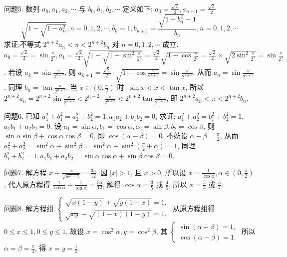 问题5. 数列 $a_0, a_1, a_2, \cdots$ 与 $b_0, b_1, b_2, \cdots$ 定义如下: $a_0=\frac{\sqrt{2}}{2}, a_{n+1}=\frac{\sqrt{2}}{2}$
$$
\sqrt{1-\sqrt{1-a_n^2}}, n=0,1,2, \cdots, b_0=1, b_{n+1}=\frac{\sqrt{1+b_n^2}-1}{b_n}, n=0,1,2, \cdots
$$
求证:不等式 $2^{n+2} a_n<\pi<2^{n+2} b_n$ 对 $n=0,1,2, \cdots$ 成立.
$a_0=\frac{\sqrt{2}}{2}=\sin \frac{\pi}{2^2}, a_1=\frac{\sqrt{2}}{2} \sqrt{1-\sqrt{1-\sin ^2 \frac{\pi}{2^2}}}=\frac{\sqrt{2}}{2} \sqrt{1-\cos \frac{\pi}{2^2}}=\frac{\sqrt{2}}{2} \times \sqrt{2 \sin ^2 \frac{\pi}{2^3}}=\sin \frac{\pi}{2^3}$. 若设 $a_k=\sin \frac{\pi}{2^{k+2}}$, 则 $a_{k+1}=\frac{\sqrt{2}}{2} \cdot \sqrt{1-\cos \frac{\pi}{2^{k+2}}}=\sin \frac{\pi}{2^{k+3}}$, 从而 $a_n=\sin \frac{\pi}{2^{n+2}}$. 同理 $b_n=\tan \frac{\pi}{2^{n+2}}$. 当 $x \in\left(0, \frac{\pi}{2}\right)$ 时, $\sin x<x<\tan x$, 所以 $2^{n+2} a_n=2^{n+2} \sin \frac{\pi}{2^{n+2}}<2^{n+2} \cdot \frac{\pi}{2^{n+2}}<2^{n+2} \tan \frac{\pi}{2^{n+2}}$, 即 $2^{n+2} a_n<\pi<2^{n+2} b_n$.



问题6. 已知 $a_1^2+b_1^2=a_2^2+b_2^2=1, a_1 a_2+b_1 b_2=0$, 求证: $a_1^2+a_2^2=b_1^2+b_2^2=1$, $a_1 b_1+a_2 b_2=0$.
设 $a_1=\sin \alpha, b_1=\cos \alpha, a_2=\sin \beta, b_2=\cos \beta$, 则 $\sin \alpha \sin \beta+ \cos \alpha \cos \beta=0$, 即 $\cos (\alpha-\beta)=0$. 不妨设 $\alpha-\beta=\frac{\pi}{2}$, 从而 $a_1^2+a_2^2=\sin ^2 \alpha+ \sin ^2 \beta=\sin ^2 \alpha+\sin ^2\left(\frac{\pi}{2}+\alpha\right)=1$, 同理 $b_1^2+b_2^2=1, a_1 b_1+a_2 b_2=\sin \alpha \cos \alpha+ \sin \beta \cos \beta=0$.



问题7. 解方程 $x+\frac{x}{\sqrt{x^2-1}}=\frac{35}{12}$.
因 $|x|>1$, 且 $x>0$, 所以设 $x=\frac{1}{\cos \alpha}, \alpha \in\left(0, \frac{\pi}{2}\right)$, 代入原方程得 $\frac{1}{\cos \alpha}+\frac{1}{\sin \alpha}=\frac{35}{12}$, 解得 $\cos \alpha=\frac{3}{5}$ 或 $\frac{4}{5}$, 所以 $x=\frac{5}{3}$ 或 $\frac{5}{4}$.



问题8. 解方程组 $\left\{\begin{array}{l}\sqrt{x(1-y)}+\sqrt{y(1-x)}=1, \\ \sqrt{x y}+\sqrt{(1-x)(1-y)}=1 .\end{array}\right.$
从原方程组得 $0 \leqslant x \leqslant 1,0 \leqslant y \leqslant 1$, 故设 $x=\cos ^2 \alpha, y=\cos ^2 \beta$, 其 $\left\{\begin{array}{l}\sin (\alpha+\beta)=1, \\ \cos (\alpha-\beta)=1 .\end{array}\right.$ 所以 $\alpha=\beta=\frac{\pi}{4}$, 得 $x=y=\frac{1}{2}$.



